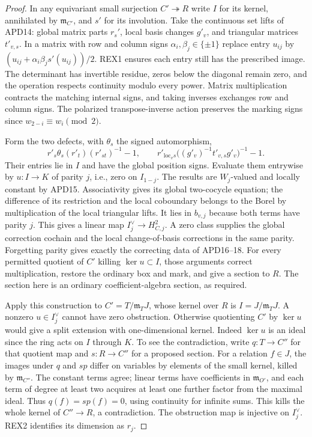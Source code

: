 \begin{proof}
In any equivariant small surjection \(C'\twoheadrightarrow R\) write
\(I\) for its kernel, annihilated by \(\mathfrak m_{C'}\), and \(s'\)
for its involution. Take the continuous set lifts of APD14: global
matrix parts \(r_s'\), local basis changes \(g'_v\), and triangular
matrices \(t'_{v,s}\). In a matrix with row and column signs
\(\alpha_i,\beta_j\in\{\pm1\}\) replace entry \(u_{ij}\) by
\((u_{ij}+\alpha_i\beta_j s'(u_{ij}))/2\). REX1 ensures each entry
still has the prescribed image. The determinant has invertible residue,
zeros below the diagonal remain zero, and the operation respects
continuity modulo every power. Matrix multiplication contracts the
matching internal signs, and taking inverses exchanges row and column
signs. The polarized transpose-inverse action preserves the marking
signs since \(w_{2-i}\equiv w_i\pmod2\).

Form the two defects, with \(\theta_s\) the signed automorphism,
\[
 r'_s\theta_s(r'_t)(r'_{st})^{-1}-1,\qquad
 r'_{\mathrm{loc}_v s}\big((g'_v)^{-1}t'_{v,s}g'_v\big)^{-1}-1.
\]
Their entries lie in \(I\) and have the global position signs.
Evaluate them entrywise by \(u:I\to K\) of parity \(j\), i.e.,
zero on \(I_{1-j}\). The results are \(W_j\)-valued and locally
constant by APD15. Associativity gives its global two-cocycle equation;
the difference of its restriction and the local coboundary belongs
to the Borel by multiplication of the local triangular lifts. It lies
in \(b_{v,j}\) because both terms have parity \(j\). This gives a
linear map \(I_j^\vee\to H^2_{C,j}\). A zero class supplies the
global correction cochain and the local change-of-basis corrections
in the same parity. Forgetting parity gives exactly the correcting
data of APD16--18. For every permitted quotient of \(C'\) killing
\(\ker u\subset I\), those arguments correct multiplication, restore
the ordinary box and mark, and give a section to \(R\). The section
here is an ordinary coefficient-algebra section, as required.

Apply this construction to \(C'=T/\mathfrak m_TJ\), whose kernel over
\(R\) is \(I=J/\mathfrak m_TJ\). A nonzero \(u\in I_j^\vee\) cannot
have zero obstruction. Otherwise quotienting \(C'\) by \(\ker u\)
would give a split extension with one-dimensional kernel. Indeed
\(\ker u\) is an ideal since the ring acts on \(I\) through \(K\).
To see the contradiction, write \(q:T\to C''\) for that quotient map
and \(s:R\to C''\) for a proposed section. For a relation \(f\in J\),
the images under \(q\) and \(sp\) differ on variables by elements of
the small kernel, killed by \(\mathfrak m_{C''}\). The constant terms
agree; linear terms have coefficients in \(\mathfrak m_{O'}\), and
each term of degree at least two acquires at least one further factor
from the maximal ideal. Thus \(q(f)=sp(f)=0\), using continuity
for infinite sums. This kills the whole kernel of \(C''\to R\),
a contradiction. The obstruction map is injective on \(I_j^\vee\).
REX2 identifies its dimension as \(r_j\).
\end{proof}

